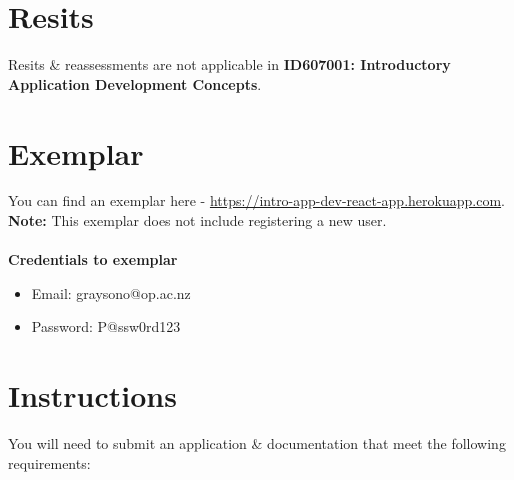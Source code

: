 \documentclass{article}
\begin{document}
\section*{Resits}
Resits \& reassessments are not applicable in \textbf{ID607001: Introductory Application Development Concepts}. 

\newpage

\section*{Exemplar}
You can find an exemplar here - \small\href{https://intro-app-dev-react-app.herokuapp.com}{https://intro-app-dev-react-app.herokuapp.com}. \textbf{Note:} This exemplar does not include registering a new user. \\ \\
\textbf{Credentials to exemplar}
\begin{itemize}
	\item Email: graysono@op.ac.nz
	\item Password: P@ssw0rd123
\end{itemize}

\section*{Instructions}
You will need to submit an application \& documentation that meet the following requirements:
\end{document}
